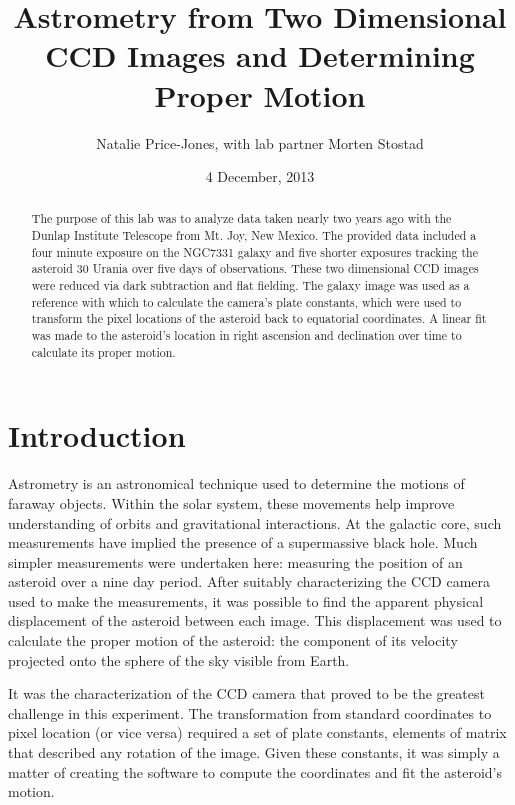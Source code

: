 \documentclass[a4paper,12pt]{article}
\begin{document}
\onehalfspacing
\title{Astrometry from Two Dimensional CCD Images and Determining Proper Motion}
\author{Natalie Price-Jones, with lab partner Morten Stostad}
\date{4 December, 2013}
\maketitle


\begin{abstract}
\label{abstract}

The purpose of this lab was to analyze data taken nearly two years ago with the Dunlap Institute Telescope from Mt. Joy, New Mexico. The provided data included a four minute exposure on the NGC7331 galaxy and five shorter exposures tracking the asteroid 30 Urania over five days of observations. These two dimensional CCD images were reduced via dark subtraction and flat fielding. The galaxy image was used as a reference with which to calculate the camera's plate constants, which were used to transform the pixel locations of the asteroid back to equatorial coordinates. A linear fit was made to the asteroid's location in right ascension and declination over time to calculate its proper motion.

\end{abstract}


\section{Introduction}
\label{sec:intro}

Astrometry is an astronomical technique used to determine the motions of faraway objects. Within the solar system, these movements help improve understanding of orbits and gravitational interactions. At the galactic core, such measurements have implied the presence of a supermassive black hole. Much simpler measurements were undertaken here: measuring the position of an asteroid over a nine day period. After suitably characterizing the CCD camera used to make the measurements, it was possible to find the apparent physical displacement of the asteroid between each image. This displacement was used to calculate the proper motion of the asteroid: the component of its velocity projected onto the sphere of the sky visible from Earth.

It was the characterization of the CCD camera that proved to be the greatest challenge in this experiment. The transformation from standard coordinates to pixel location (or vice versa) required a set of plate constants, elements of matrix that described any rotation of the image. Given these constants, it was simply a matter of creating the software to compute the coordinates and fit the asteroid's motion.
\end{document}
